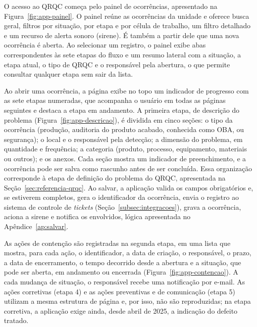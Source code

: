 O acesso ao QRQC começa pelo painel de ocorrências, apresentado na Figura~\ref{fig:app-painel}. O painel reúne as ocorrências da unidade e oferece busca geral, filtros por situação, por etapa e por célula de trabalho, um filtro detalhado e um recurso de alerta sonoro (sirene). É também a partir dele que uma nova ocorrência é aberta. Ao selecionar um registro, o painel exibe abas correspondentes às sete etapas do fluxo e um resumo lateral com a situação, a etapa atual, o tipo de QRQC e o responsável pela abertura, o que permite consultar qualquer etapa sem sair da lista.


Ao abrir uma ocorrência, a página exibe no topo um indicador de progresso com as sete etapas numeradas, que acompanha o usuário em todas as páginas seguintes e destaca a etapa em andamento. A primeira etapa, de descrição do problema (Figura~\ref{fig:app-descricao}), é dividida em cinco seções: o tipo da ocorrência (produção, auditoria do produto acabado, conhecida como OBA, ou segurança); o local e o responsável pela detecção; a dimensão do problema, em quantidade e frequência; a categoria (produto, processo, equipamento, materiais ou outros); e os anexos. Cada seção mostra um indicador de preenchimento, e a ocorrência pode ser salva como rascunho antes de ser concluída. Essa organização corresponde à etapa de definição do problema do QRQC, apresentada na Seção~\ref{sec:referencia-qrqc}. Ao salvar, a aplicação valida os campos obrigatórios e, se estiverem completos, gera o identificador da ocorrência, envia o registro ao sistema de controle de \textit{tickets} (Seção~\ref{subsec:integracoes}), grava a ocorrência, aciona a sirene e notifica os envolvidos, lógica apresentada no Apêndice~\ref{ap:salvar}.


As ações de contenção são registradas na segunda etapa, em uma lista que mostra, para cada ação, o identificador, a data de criação, o responsável, o prazo, a data de encerramento, o tempo decorrido desde a abertura e a situação, que pode ser aberta, em andamento ou encerrada (Figura~\ref{fig:app-contencao}). A cada mudança de situação, o responsável recebe uma notificação por e-mail. As ações corretivas (etapa 4) e as ações preventivas e de comunicação (etapa 5) utilizam a mesma estrutura de página e, por isso, não são reproduzidas; na etapa corretiva, a aplicação exige ainda, desde abril de 2025, a indicação do defeito tratado.

